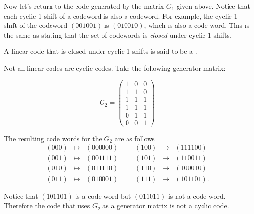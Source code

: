 Now let's return to the code generated by the matrix $G_1$ given above. Notice that each cyclic 1-shift of a codeword is also a codeword.  For example, the cyclic 1-shift of the codeword $(001001)$ is $(010010)$, which is also a code word.  This is the same as stating that the set of codewords is \emph{closed} under cyclic 1-shifts.  

\begin{defn}\label{def:cycliccode}
A linear code that is closed under cyclic 1-shifts is said to be a .  
\end {defn}

Not all linear codes are cyclic codes.  Take the following generator matrix: 

\[
G_2 = 
\begin{pmatrix}
1 & 0 & 0 \\
1 & 1 & 0 \\
1 & 1 & 1 \\
1 & 1 & 1 \\
0 & 1 & 1 \\
0 & 0 & 1
\end{pmatrix}
\]

The resulting code words for the $G_2$ are as follows\[
\begin{array}{rclccrcl}
(000) & \mapsto & (000000) & & & (100) & \mapsto & (111100) \\
(001) & \mapsto & (001111) & & & (101) & \mapsto & (110011) \\
(010) & \mapsto & (011110) & & & (110) & \mapsto & (100010) \\
(011) & \mapsto & (010001) & & & (111) & \mapsto & (101101).
\end{array}
\]

Notice that $(101101)$ is a code word but $(011011)$ is not a code word.  Therefore the code that uses $G_2$ as a generator matrix is not a cyclic code.

